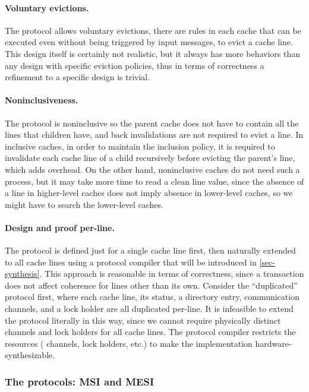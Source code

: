 \paragraph{Voluntary evictions.}

The protocol allows voluntary evictions, \ie{} there are rules in each cache that can be executed even without being triggered by input messages, to evict a cache line.
This design itself is certainly not realistic, but it always has more behaviors than any design with specific eviction policies, thus in terms of correctness a refinement to a specific design is trivial.

\paragraph{Noninclusiveness.}

The protocol is noninclusive so the parent cache does not have to contain all the lines that children have, and back invalidations are not required to evict a line.
In inclusive caches, in order to maintain the inclusion policy, it is required to invalidate each cache line of a child recursively before evicting the parent's line, which adds overhead.
On the other hand, noninclusive caches do not need such a process, but it may take more time to read a clean line value, since the absence of a line in higher-level caches does not imply absence in lower-level caches, so we might have to search the lower-level caches.

\paragraph{Design and proof per-line.}

The protocol is defined just for a single cache line first, then naturally extended to all cache lines using a protocol compiler that will be introduced in \autoref{sec-synthesis}.
This approach is reasonable in terms of correctness, since a transaction does not affect coherence for lines other than its own.
Consider the ``duplicated'' protocol first, where each cache line, its status, a directory entry, communication channels, and a lock holder are all duplicated per-line.
It is infeasible to extend the protocol literally in this way, since we cannot require physically distinct channels and lock holders for all cache lines.
The protocol compiler restricts the resources (\eg{} channels, lock holders, etc.) to make the implementation hardware-synthesizable.

\subsubsection{The protocols: MSI and MESI}

